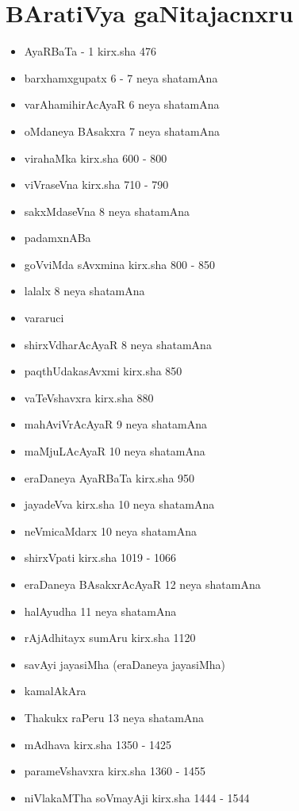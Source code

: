 \chapter{BAratiVya gaNitajacnxru}

{\renewcommand\labelitemi{}
\begin{itemize}
\item AyaRBaTa - {\rm 1} kirx.sha {\rm 476}
\item barxhamxgupatx {\rm 6 - 7} neya shatamAna
\item varAhamihirAcAyaR {\rm 6} neya shatamAna
\item oMdaneya BAsakxra {\rm 7} neya shatamAna
\item virahaMka kirx.sha {\rm 600 - 800}
\item viVraseVna kirx.sha {\rm 710 - 790}
\item sakxMdaseVna {\rm 8} neya shatamAna
\item padamxnABa
\item goVviMda sAvxmina kirx.sha {\rm 800 - 850}
\item lalalx {\rm 8} neya shatamAna
\item vararuci
\item shirxVdharAcAyaR {\rm 8} neya shatamAna
\item paqthUdakasAvxmi kirx.sha {\rm 850}
\item vaTeVshavxra kirx.sha {\rm 880}
\item mahAviVrAcAyaR {\rm 9} neya shatamAna
\item maMjuLAcAyaR {\rm 10} neya shatamAna
\item eraDaneya AyaRBaTa kirx.sha {\rm 950}
\item  jayadeVva kirx.sha {\rm 10} neya shatamAna
\item neVmicaMdarx {\rm 10} neya shatamAna
\item shirxVpati kirx.sha {\rm 1019 - 1066}
\item eraDaneya BAsakxrAcAyaR {\rm 12} neya shatamAna
\item halAyudha {\rm 11} neya shatamAna
\item rAjAdhitayx sumAru kirx.sha {\rm 1120}
\item savAyi jayasiMha (eraDaneya jayasiMha)
\item kamalAkAra
\item Thakukx raPeru {\rm 13} neya shatamAna
\item mAdhava kirx.sha {\rm 1350 - 1425}
\item parameVshavxra kirx.sha {\rm 1360 - 1455}
\item niVlakaMTha soVmayAji kirx.sha {\rm 1444 - 1544}

\end{itemize}}
